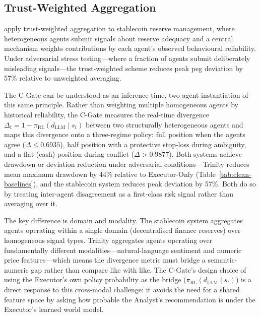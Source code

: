 \subsection{Trust-Weighted Aggregation}
\label{sec:disc-trust-weighted}

\cite{you_stablecoin_2026} apply trust-weighted aggregation to stablecoin
reserve management, where heterogeneous agents submit signals about reserve
adequacy and a central mechanism weights contributions by each agent's
observed behavioural reliability. Under adversarial stress testing---where a
fraction of agents submit deliberately misleading signals---the trust-weighted
scheme reduces peak peg deviation by 57\% relative to unweighted averaging.

The C-Gate can be understood as an inference-time, two-agent instantiation of
this same principle. Rather than weighting multiple homogeneous agents by
historical reliability, the C-Gate measures the real-time divergence
$\Delta_t = 1 - \pi_{\text{RL}}(d_{\text{LLM}} \mid s_t)$ between two
structurally heterogeneous agents and maps this divergence onto a three-regime
policy: full position when the agents agree ($\Delta \leq 0.6935$), half
position with a protective stop-loss during ambiguity, and a flat (cash)
position during conflict ($\Delta > 0.9877$). Both systems achieve drawdown or
deviation reduction under adversarial conditions---Trinity reduces mean maximum
drawdown by 44\% relative to Executor-Only
(Table~\ref{tab:clean-baselines}), and the stablecoin system reduces peak
deviation by 57\%. Both do so by treating inter-agent disagreement as a
first-class risk signal rather than averaging over it.

The key difference is domain and modality. The stablecoin system aggregates
agents operating within a single domain (decentralised finance reserves) over
homogeneous signal types. Trinity aggregates agents operating over
fundamentally different modalities---natural-language sentiment and numeric
price features---which means the divergence metric must bridge a semantic-numeric
gap rather than compare like with like. The C-Gate's design choice of using the
Executor's own policy probability as the bridge
($\pi_{\text{RL}}(d_{\text{LLM}} \mid s_t)$) is a direct response to this
cross-modal challenge: it avoids the need for a shared feature space by asking
how probable the Analyst's recommendation is under the Executor's learned
world model.

